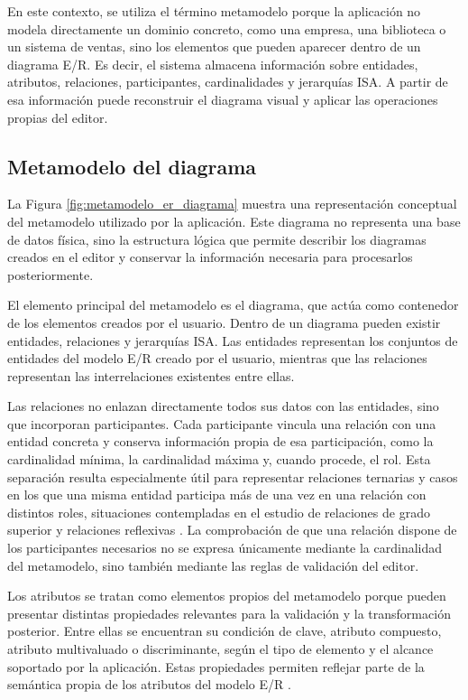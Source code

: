 En este contexto, se utiliza el término metamodelo porque la aplicación no modela directamente un dominio concreto, como una empresa, una biblioteca o un sistema de ventas, sino los elementos que pueden aparecer dentro de un diagrama E/R. Es decir, el sistema almacena información sobre entidades, atributos, relaciones, participantes, cardinalidades y jerarquías ISA. A partir de esa información puede reconstruir el diagrama visual y aplicar las operaciones propias del editor.

\subsection{Metamodelo del diagrama}

La Figura \ref{fig:metamodelo_er_diagrama} muestra una representación conceptual del metamodelo utilizado por la aplicación. Este diagrama no representa una base de datos física, sino la estructura lógica que permite describir los diagramas creados en el editor y conservar la información necesaria para procesarlos posteriormente.


El elemento principal del metamodelo es el diagrama, que actúa como contenedor de los elementos creados por el usuario. Dentro de un diagrama pueden existir entidades, relaciones y jerarquías ISA. Las entidades representan los conjuntos de entidades del modelo E/R creado por el usuario, mientras que las relaciones representan las interrelaciones existentes entre ellas.

Las relaciones no enlazan directamente todos sus datos con las entidades, sino que incorporan participantes. Cada participante vincula una relación con una entidad concreta y conserva información propia de esa participación, como la cardinalidad mínima, la cardinalidad máxima y, cuando procede, el rol. Esta separación resulta especialmente útil para representar relaciones ternarias y casos en los que una misma entidad participa más de una vez en una relación con distintos roles, situaciones contempladas en el estudio de relaciones de grado superior y relaciones reflexivas \cite{tema6}. La comprobación de que una relación dispone de los participantes necesarios no se expresa únicamente mediante la cardinalidad del metamodelo, sino también mediante las reglas de validación del editor.

Los atributos se tratan como elementos propios del metamodelo porque pueden presentar distintas propiedades relevantes para la validación y la transformación posterior. Entre ellas se encuentran su condición de clave, atributo compuesto, atributo multivaluado o discriminante, según el tipo de elemento y el alcance soportado por la aplicación. Estas propiedades permiten reflejar parte de la semántica propia de los atributos del modelo E/R \cite{tema6}.

